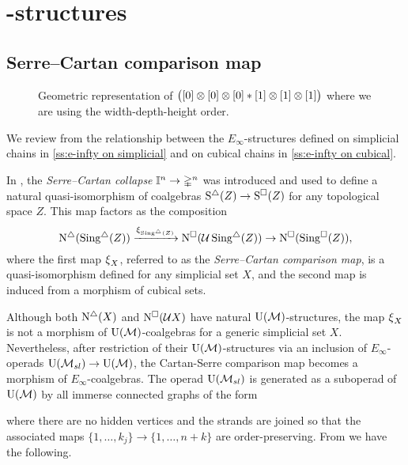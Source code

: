 


\section{\pdfEinfty-structures}

\subsection{Serre--Cartan comparison map}


\begin{figure}[h!]
	\centering
	
	\caption{Geometric representation of $\big([0]\otimes[0]\otimes[0] \ast [1]\otimes[1]\otimes[1]\big)$ where we are using the width-depth-height order.}
	\label{f:product}
\end{figure}

We review from \cite{medina2022cube_einfty} the relationship between the $E_\infty$-structures defined on simplicial chains in \cref{ss:e-infty on simplicial} and on cubical chains in \cref{ss:e-infty on cubical}.

In \cite[p.442]{serre1951homologie}, the \textit{Serre--Cartan collapse} $\mathbb{I}^n \to \mathbb{\Delta}^n$ was introduced and used to define a natural quasi-isomorphism of coalgebras $\operatorname{S^{\triangle}}(Z) \to \operatorname{S^{\square}}(Z)$ for any topological space $Z$.
This map factors as the composition
\[
\operatorname{N^{\triangle}}(\operatorname{Sing^{\triangle}}(Z)) \xrightarrow{\operatorname{\xi}_{\operatorname{Sing^{\triangle}}(Z)}}
\operatorname{N^{\square}}(\mathcal{U} \operatorname{Sing^{\triangle}}(Z)) \to
\operatorname{N^{\square}}(\operatorname{Sing^{\square}}(Z)),
\]
where the first map $\operatorname{\xi}_X$, referred to as the \textit{Serre--Cartan comparison map}, is a quasi-isomorphism defined for any simplicial set $X$, and the second map is induced from a morphism of cubical sets.

Although both $\operatorname{N^{\triangle}}(X)$ and $\operatorname{N^{\square}}(\mathcal{U} X)$ have natural ${\operatorname{U}(\mathcal{M})}$-structures, the map $\operatorname{\xi}_X$ is not a morphism of ${\operatorname{U}(\mathcal{M})}$-coalgebras for a generic simplicial set $X$.
Nevertheless, after restriction of their ${\operatorname{U}(\mathcal{M})}$-structures via an inclusion of $E_\infty$-operads ${\operatorname{U}(\mathcal{M}_{sl})} \to {\operatorname{U}(\mathcal{M})}$, the Cartan-Serre comparison map becomes a morphism of $E_\infty$-coalgebras.
The operad ${\operatorname{U}(\mathcal{M}_{sl})}$ is generated as a suboperad of ${\operatorname{U}(\mathcal{M})}$ by all immerse connected graphs of the form

where there are no hidden vertices and the strands are joined so that the associated maps $\{1, \dots, k_j\} \to \{1, \dots, n+k\}$ are order-preserving.
From \cite{medina2022cube_einfty} we have the following.

